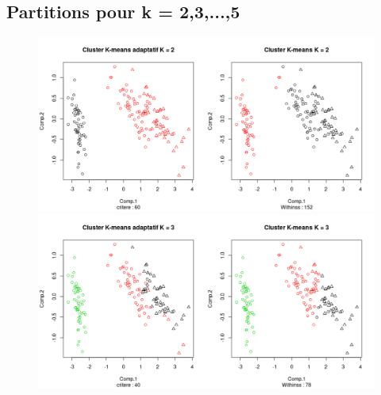\documentclass[a4paper, titlepage]{report}
\begin{document}
\subsection*{Partitions pour k = 2,3,...,5}
\begin{figure}[h]
	\begin{center}
		\includegraphics[scale = 0.21]{./doc/iris-ks-2.png}
		\includegraphics[scale = 0.21]{./doc/iris-ks-3.png}
	\end{center}
\end{figure}
\end{document}
